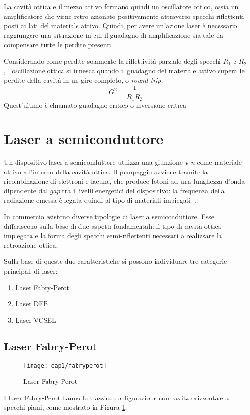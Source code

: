 La cavità ottica e il mezzo attivo formano quindi un oscillatore ottico, ossia un amplificatore che viene retro-azionato positivamente attraverso specchi riflettenti posti ai lati del materiale attivo. Quindi, per avere un'azione laser è necessario raggiungere una situazione in cui il guadagno di amplificazione sia tale da compensare tutte le perdite presenti. 

Considerando come perdite solamente la riflettività parziale degli specchi $R_1$ e $R_2$, l'oscillazione ottica si innesca quando il guadagno del materiale attivo supera le perdite della cavità in un giro completo, o \textit{round trip}:
\begin{equation}
  G^2=\frac{1}{R_1R_2}
\end{equation}
Quest'ultimo è chiamato guadagno critico o inversione critica.

\section{Laser a semiconduttore}
Un dispositivo laser a semiconduttore utilizza una giunzione \textit{p-n} come materiale attivo all'interno della cavità ottica. Il pompaggio avviene tramite la ricombinazione di elettroni e lacune, che produce fotoni ad una lunghezza d'onda dipendente dal \textit{gap} tra i livelli energetici del dispositivo: la frequenza della radiazione emessa è legata quindi al tipo di materiali impiegati~\cite{sveltolaser}.

In commercio esistono diverse tipologie di laser a semiconduttore. Esse differiscono sulla base di due aspetti fondamentali: il tipo di cavità ottica impiegata e la forma degli specchi semi-riflettenti necessari a realizzare la retroazione ottica. 

Sulla base di queste due caratteristiche si possono individuare tre categorie principali di laser:
\begin{enumerate}
	\item Laser Fabry-Perot
	\item Laser DFB
	\item Laser VCSEL
\end{enumerate}

\subsection{Laser Fabry-Perot}
\begin{figure}[H]
  \begin{center}
    \texttt{[image: cap1/fabryperot]}
    \caption{Laser Fabry-Perot}
    \label{fabryperot}
  \end{center}
\end{figure}
I laser Fabry-Perot hanno la classica configurazione con cavità orizzontale a specchi piani, come mostrato in Figura \ref{fabryperot}.

